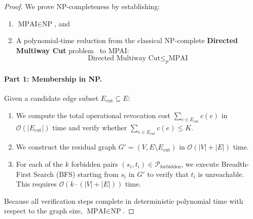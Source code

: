 \begin{proof}
We prove NP-completeness by establishing:
\begin{enumerate}
    \item $\text{MPAI} \in \text{NP}$, and
    \item A polynomial-time reduction from the classical NP-complete \textbf{Directed Multiway Cut} problem~\cite{garg1994multiway} to MPAI:
    \begin{equation}
    \text{Directed Multiway Cut} \le_p \text{MPAI}
    \end{equation}
\end{enumerate}

\paragraph{Part 1: Membership in NP.}
Given a candidate edge subset $E_{\text{cut}} \subseteq E$:
\begin{enumerate}
    \item We compute the total operational revocation cost $\sum_{e \in E_{\text{cut}}} c(e)$ in $\mathcal{O}(|E_{\text{cut}}|)$ time and verify whether $\sum_{e \in E_{\text{cut}}} c(e) \le K$.
    \item We construct the residual graph $G' = (V, E \setminus E_{\text{cut}})$ in $\mathcal{O}(|V| + |E|)$ time.
    \item For each of the $k$ forbidden pairs $(s_i, t_i) \in \mathcal{P}_{\text{forbidden}}$, we execute Breadth-First Search (BFS) starting from $s_i$ in $G'$ to verify that $t_i$ is unreachable. This requires $\mathcal{O}(k \cdot (|V| + |E|))$ time.
\end{enumerate}
Because all verification steps complete in deterministic polynomial time with respect to the graph size, $\text{MPAI} \in \text{NP}$.


\end{proof}
